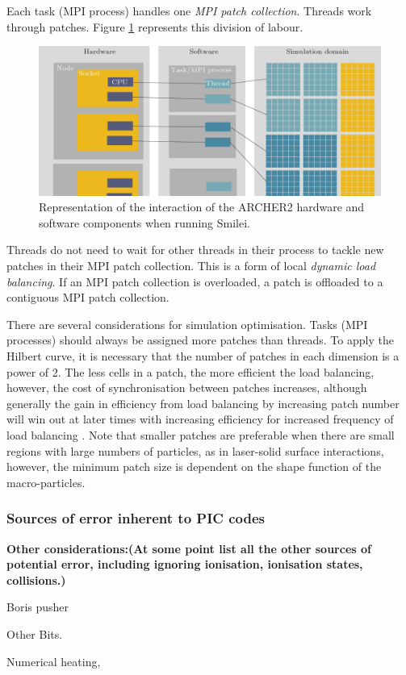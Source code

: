 Each task (MPI process) handles one \textit{MPI patch collection}. Threads work through patches. Figure \ref{fig:introsmileiparallelisationcomplex} represents this division of labour.
\begin{figure}
	\centering
	\includegraphics[width=1\linewidth]{figures/intro/intro_smilei_parallelisation_complex}
	\caption[Representation of the interaction of the ARCHER2 hardware and software components when running Smilei.]{Representation of the interaction of the ARCHER2 hardware and software components when running Smilei.}
	\label{fig:introsmileiparallelisationcomplex}
\end{figure}
Threads do not need to wait for other threads in their process to tackle new patches in their MPI patch collection. This is a form of local \textit{dynamic load balancing}. If an MPI patch collection is overloaded, a patch is offloaded to a contiguous MPI patch collection.

There are several considerations for simulation optimisation. Tasks (MPI processes) should always be assigned more patches than threads. To apply the Hilbert curve, it is necessary that the number of patches in each dimension is a power of 2. The less cells in a patch, the more efficient the load balancing, however, the cost of synchronisation between patches increases, although generally the gain in efficiency from load balancing by increasing patch number will win out at later times with increasing efficiency for increased frequency of load balancing \cite{derouillatSmileiCollaborativeOpensource2018}. Note that smaller patches are preferable when there are small regions with large numbers of particles, as in laser-solid surface interactions, however, the minimum patch size is dependent on the shape function of the macro-particles.

\subsubsection{Sources of error inherent to PIC codes}

\textbf{Other considerations:(At some point list all the other sources of potential error, including ignoring ionisation, ionisation states, collisions.)}

Boris pusher

Other Bits.



Numerical heating, 